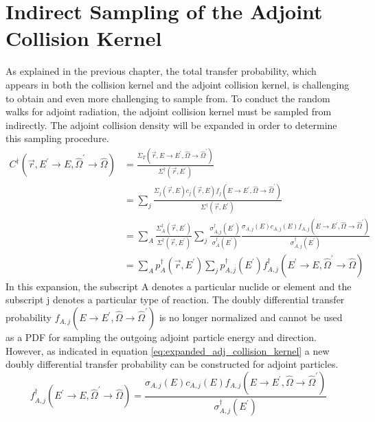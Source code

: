 \section{Indirect Sampling of the Adjoint Collision Kernel}
As explained in the previous chapter, the total transfer probability, which
appears in both the collision kernel and the adjoint collision kernel, is
challenging to obtain and even more challenging to sample from. To conduct
the random walks for adjoint radiation, the adjoint collision kernel 
must be sampled from indirectly. The adjoint collision density will be expanded 
in order to determine this sampling procedure. 
\begin{align}
  C^{\dagger}(\vec{r},E^{'} \to E,\hat{\Omega}^{'} \to \hat{\Omega}) & =
  \frac{\Sigma_T(\vec{r},E \to E^{'},\hat{\Omega} \to \hat{\Omega}^{'})}
       {\Sigma^{\dagger}(\vec{r},E^{'})} \nonumber \\
       & = \sum_j 
       \frac{\Sigma_{j}(\vec{r},E)c_j(\vec{r},E)
         f_j(E \to E^{'},\hat{\Omega} \to \hat{\Omega}^{'})}
            {\Sigma^{\dagger}(\vec{r},E^{'})} \nonumber \\
  & = \sum_A \frac{\Sigma_A^{\dagger}(\vec{r},E^{'})}
                  {\Sigma^{\dagger}(\vec{r},E^{'})}
  \sum_j \frac{\sigma_{A,j}^{\dagger}(E^{'})}{\sigma_A^{\dagger}(E^{'})}
  \frac{\sigma_{A,j}(E) c_{A,j}(E) 
        f_{A,j}(E \to E^{'},\hat{\Omega} \to \hat{\Omega}^{'})}
       {\sigma_{A,j}^{\dagger}(E^{'})} \nonumber \\
  & = \sum_A p_A^{\dagger}(\vec{r},E^{'}) \sum_j p_{A,j}^{\dagger}(E^{'})
       f_{A,j}^{\dagger}(E^{'} \to E,\hat{\Omega}^{'} \to \hat{\Omega})
  \label{eq:expanded_adj_collision_kernel}
\end{align}
In this expansion, the subscript A denotes a particular nuclide or element
and the subscript j denotes a particular type of reaction. The doubly 
differential transfer probability
$f_{A,j}(E \to E^{'},\hat{\Omega} \to \hat{\Omega}^{'})$ is no longer normalized 
and cannot be used as a PDF for sampling the outgoing adjoint particle energy 
and direction. However, as indicated in equation 
\ref{eq:expanded_adj_collision_kernel} a new doubly differential transfer
probability can be constructed for adjoint particles. 
\begin{equation}
  f_{A,j}^{\dagger}(E^{'} \to E,\hat{\Omega}^{'} \to \hat{\Omega}) = 
  \frac{\sigma_{A,j}(E)c_{A,j}(E) 
    f_{A,j}(E \to E^{'},\hat{\Omega} \to \hat{\Omega}^{'})}
       {\sigma_{A,j}^{\dagger}(E^{'})}
  \label{eq:adjoint_double_diff_transfer_prob}
\end{equation}

